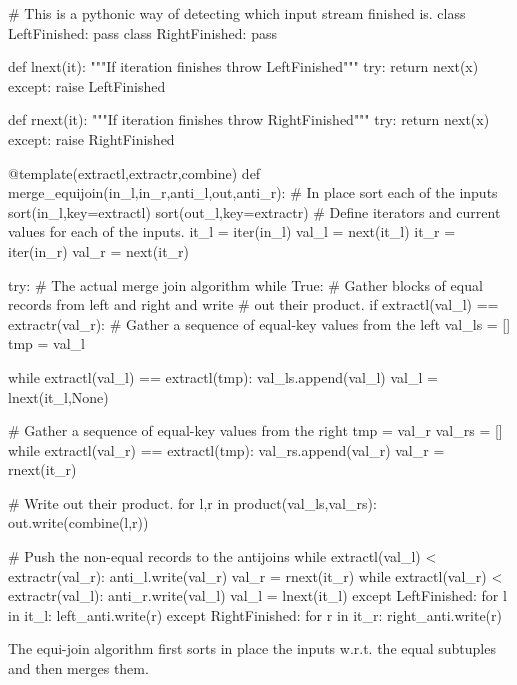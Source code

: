 \begin{code}
\begin{pycode}
# This is a pythonic way of detecting which input stream finished is.
class LeftFinished:
    pass
class RightFinished:
    pass


def lnext(it):
    """If iteration finishes throw LeftFinished"""
    try:
        return next(x)
    except:
        raise LeftFinished

def rnext(it):
    """If iteration finishes throw RightFinished"""
    try:
        return next(x)
    except:
        raise RightFinished

@template(extractl,extractr,combine)
def merge_equijoin(in_l,in_r,anti_l,out,anti_r):
    # In place sort each of the inputs
    sort(in_l,key=extractl)
    sort(out_l,key=extractr)
    # Define iterators and current values for each of the inputs.
    it_l = iter(in_l)
    val_l = next(it_l)
    it_r = iter(in_r)
    val_r = next(it_r)

    try:
        # The actual merge join algorithm
        while True:
            # Gather blocks of equal records from left and right and write
            # out their product.
            if extractl(val_l) == extractr(val_r):
                # Gather a sequence of equal-key values from the left
                val_ls = []
                tmp = val_l

                while extractl(val_l) == extractl(tmp):
                    val_ls.append(val_l)
                    val_l = lnext(it_l,None)

                # Gather a sequence of equal-key values from the right
                tmp = val_r
                val_rs = []
                while extractl(val_r) == extractl(tmp):
                    val_rs.append(val_r)
                    val_r = rnext(it_r)

                # Write out their product.
                for l,r in product(val_ls,val_rs):
                    out.write(combine(l,r))

            # Push the non-equal records to the antijoins
            while extractl(val_l) < extractr(val_r):
                anti_l.write(val_r)
                val_r = rnext(it_r)
            while extractl(val_r) < extractr(val_l):
                anti_r.write(val_l)
                val_l = lnext(it_l)
    except LeftFinished:
        for l in it_l:
            left_anti.write(r)
    except RightFinished:
        for r in it_r:
            right_anti.write(r)
\end{pycode}
\caption{\label{lst:join_algorithm}The equi-join algorithm first sorts
  in place the inputs w.r.t. the equal subtuples and then merges
  them.}
\end{code}


